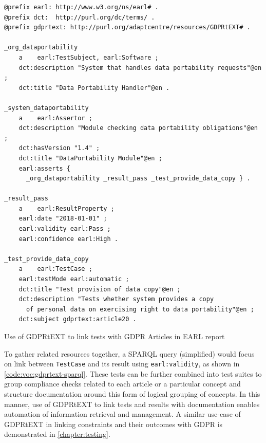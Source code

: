 \begin{listing}
\begin{verbatim}
@prefix earl: http://www.w3.org/ns/earl# .
@prefix dct:  http://purl.org/dc/terms/ .
@prefix gdprtext: http://purl.org/adaptcentre/resources/GDPRtEXT# .

_org_dataportability
    a    earl:TestSubject, earl:Software ;
    dct:description "System that handles data portability requests"@en ;
    dct:title "Data Portability Handler"@en .

_system_dataportability
    a    earl:Assertor ;
    dct:description "Module checking data portability obligations"@en ;
    dct:hasVersion "1.4" ;
    dct:title "DataPortability Module"@en ;
    earl:asserts { 
      _org_dataportability _result_pass _test_provide_data_copy } .

_result_pass
    a    earl:ResultProperty ;
    earl:date "2018-01-01" ;
    earl:validity earl:Pass ;
    earl:confidence earl:High .

_test_provide_data_copy
    a    earl:TestCase ;
    earl:testMode earl:automatic ;
    dct:title "Test provision of data copy"@en ;
    dct:description "Tests whether system provides a copy 
      of personal data on exercising right to data portability"@en ;
    dct:subject gdprtext:article20 .
\end{verbatim}
\label{code:voc:gdprtext-earl}
\caption{Use of GDPRtEXT to link tests with GDPR Articles in EARL report}
\end{listing}

To gather related resources together, a SPARQL query (simplified) would focus on link between \texttt{TestCase} and its result using \texttt{earl:validity}, as shown in \autoref{code:voc:gdprtext-sparql}.
These tests can be further combined into test suites to group compliance checks related to each article or a particular concept and structure  documentation around this form of logical grouping of concepts.
In this manner, use of GDPRtEXT to link tests and results with documentation enables automation of information retrieval and management.
A similar use-case of GDPRtEXT in linking constraints and their outcomes with GDPR is demonstrated in \autoref{chapter:testing}.

